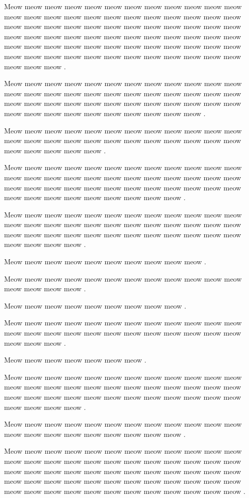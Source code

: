 \documentclass[12pt, a5paper, openany]{book}
\begin{document}
Meow meow meow meow meow meow meow meow meow meow meow meow meow meow meow meow meow meow meow meow meow meow meow meow meow meow meow meow meow meow meow meow meow meow meow meow meow meow meow meow meow meow meow meow meow meow meow meow meow meow meow meow meow meow meow meow meow meow meow meow meow meow meow meow meow meow meow meow meow meow meow meow meow meow meow .

Meow meow meow meow meow meow meow meow meow meow meow meow meow meow meow meow meow meow meow meow meow meow meow meow meow meow meow meow meow meow meow meow meow meow meow meow meow meow meow meow meow meow meow meow meow meow .

Meow meow meow meow meow meow meow meow meow meow meow meow meow meow meow meow meow meow meow meow meow meow meow meow meow meow meow meow meow .

Meow meow meow meow meow meow meow meow meow meow meow meow meow meow meow meow meow meow meow meow meow meow meow meow meow meow meow meow meow meow meow meow meow meow meow meow meow meow meow meow meow meow meow meow meow .

Meow meow meow meow meow meow meow meow meow meow meow meow meow meow meow meow meow meow meow meow meow meow meow meow meow meow meow meow meow meow meow meow meow meow meow meow meow meow meow meow .

Meow meow meow meow meow meow meow meow meow meow .

Meow meow meow meow meow meow meow meow meow meow meow meow meow meow meow meow .

Meow meow meow meow meow meow meow meow meow .

Meow meow meow meow meow meow meow meow meow meow meow meow meow meow meow meow meow meow meow meow meow meow meow meow meow meow meow .

Meow meow meow meow meow meow meow .

Meow meow meow meow meow meow meow meow meow meow meow meow meow meow meow meow meow meow meow meow meow meow meow meow meow meow meow meow meow meow meow meow meow meow meow meow meow meow meow meow .

Meow meow meow meow meow meow meow meow meow meow meow meow meow meow meow meow meow meow meow meow meow .

Meow meow meow meow meow meow meow meow meow meow meow meow meow meow meow meow meow meow meow meow meow meow meow meow meow meow meow meow meow meow meow meow meow meow meow meow meow meow meow meow meow meow meow meow meow meow meow meow meow meow meow meow meow meow meow meow meow meow meow meow .
\end{document}
